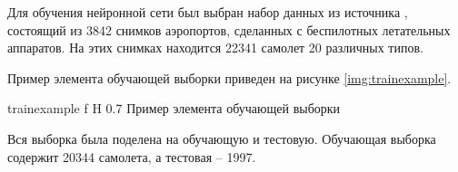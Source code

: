 Для обучения нейронной сети был выбран набор данных из источника \cite{planesdataset}, состоящий из 3842 снимков аэропортов, сделанных с беспилотных летательных аппаратов. На этих снимках находится 22341 самолет 20 различных типов.

Пример элемента обучающей выборки приведен на рисунке \ref{img:trainexample}.

{trainexample} %
{f} %
{H} %
{0.7\textwidth} %
{Пример элемента обучающей выборки} %


Вся выборка была поделена на обучающую и тестовую. Обучающая выборка содержит 20344 самолета, а тестовая -- 1997.